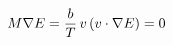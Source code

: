 \documentclass[preview]{standalone}
\begin{document}
\begin{align*}
\special{dvisvgm:raw <g id='unique000'>}M\nabla E=\frac bT\,v\,(v\cdot\nabla E)=0\special{dvisvgm:raw </g>}
\end{align*}
\end{document}
